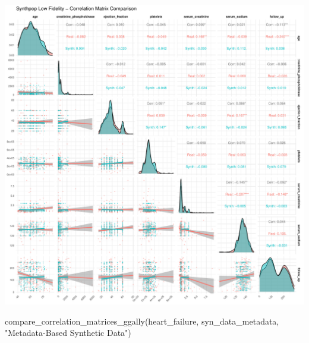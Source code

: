 \documentclass[
  letterpaper,
  DIV=11,
  numbers=noendperiod]{scrartcl}
\newenvironment{Shaded}{\begin{snugshade}}{\end{snugshade}}
\newcommand{\FunctionTok}[1]{\textcolor[rgb]{0.28,0.35,0.67}{#1}}
\newcommand{\NormalTok}[1]{\textcolor[rgb]{0.00,0.23,0.31}{#1}}
\newcommand{\StringTok}[1]{\textcolor[rgb]{0.13,0.47,0.30}{#1}}
\begin{document}
\begin{center}
\includegraphics[width=1\linewidth,height=\textheight,keepaspectratio]{heart_failure_synthetic_data_project_files/figure-pdf/Correlation Matrices Comparison using GGally-3.pdf}
\end{center}

\begin{Shaded}
\begin{Highlighting}[]
\FunctionTok{compare\_correlation\_matrices\_ggally}\NormalTok{(heart\_failure, syn\_data\_metadata, }\StringTok{"Metadata{-}Based Synthetic Data"}\NormalTok{)}
\end{Highlighting}
\end{Shaded}
\end{document}
